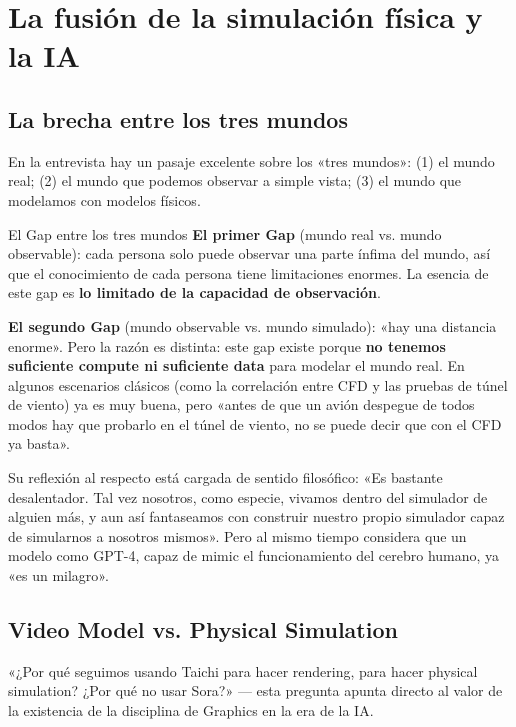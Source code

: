 \section{La fusión de la simulación física y la IA}

\subsection{La brecha entre los tres mundos}

En la entrevista hay un pasaje excelente sobre los «tres mundos»: (1) el mundo real; (2) el mundo que podemos observar a simple vista; (3) el mundo que modelamos con modelos físicos.

\begin{importantbox}{El Gap entre los tres mundos}
\textbf{El primer Gap} (mundo real vs. mundo observable): cada persona solo puede observar una parte ínfima del mundo, así que el conocimiento de cada persona tiene limitaciones enormes. La esencia de este gap es \textbf{lo limitado de la capacidad de observación}.

\textbf{El segundo Gap} (mundo observable vs. mundo simulado): «hay una distancia enorme». Pero la razón es distinta: este gap existe porque \textbf{no tenemos suficiente compute ni suficiente data} para modelar el mundo real. En algunos escenarios clásicos (como la correlación entre CFD y las pruebas de túnel de viento) ya es muy buena, pero «antes de que un avión despegue de todos modos hay que probarlo en el túnel de viento, no se puede decir que con el CFD ya basta».
\end{importantbox}

Su reflexión al respecto está cargada de sentido filosófico: «Es bastante desalentador. Tal vez nosotros, como especie, vivamos dentro del simulador de alguien más, y aun así fantaseamos con construir nuestro propio simulador capaz de simularnos a nosotros mismos». Pero al mismo tiempo considera que un modelo como GPT-4, capaz de mimic el funcionamiento del cerebro humano, ya «es un milagro».

\subsection{Video Model vs. Physical Simulation}

«¿Por qué seguimos usando Taichi para hacer rendering, para hacer physical simulation? ¿Por qué no usar Sora?» — esta pregunta apunta directo al valor de la existencia de la disciplina de Graphics en la era de la IA.

